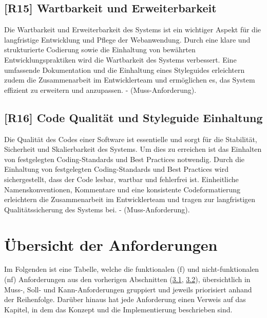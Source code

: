 \subsection{[R15] Wartbarkeit und Erweiterbarkeit}

Die Wartbarkeit und Erweiterbarkeit des Systems ist ein wichtiger Aspekt für die langfristige Entwicklung und Pflege der Webanwendung.
Durch eine klare und strukturierte Codierung sowie die Einhaltung von bewährten Entwicklungspraktiken wird die Wartbarkeit des Systems verbessert.
Eine umfassende Dokumentation und die Einhaltung eines Styleguides erleichtern zudem die Zusammenarbeit im Entwicklerteam und ermöglichen es, das System effizient zu erweitern und anzupassen.
- (Muss-Anforderung).

\subsection{[R16] Code Qualität und Styleguide Einhaltung}

Die Qualität des Codes einer Software ist essentielle und sorgt für die Stabilität, Sicherheit und Skalierbarkeit des Systems.
Um dies zu erreichen ist das Einhalten von festgelegten Coding-Standards und Best Practices notwendig.
Durch die Einhaltung von festgelegten Coding-Standards und Best Practices wird sichergestellt, dass der Code lesbar, wartbar und fehlerfrei ist.
Einheitliche Namenskonventionen, Kommentare und eine konsistente Codeformatierung erleichtern die Zusammenarbeit im Entwicklerteam und tragen zur langfristigen Qualitätssicherung des Systems bei.
- (Muss-Anforderung).

\section{Übersicht der Anforderungen}
\label{chapter:3-section:uebersicht-anforderungen}

Im Folgenden ist eine Tabelle, welche die funktionalen (f) und nicht-funktionalen (nf) Anforderungen aus den vorherigen Abschnitten (\hyperref[chapter:3-section:funktionale-anforderungen]{3.1}, \hyperref[chapter:3-section:nichtfunktionale-anforderungen]{3.2}), übersichtlich in Muss-, Soll- und Kann-Anforderungen gruppiert und jeweils priorisiert anhand der Reihenfolge.
Darüber hinaus hat jede Anforderung einen Verweis auf das Kapitel, in dem das Konzept und die Implementierung beschrieben sind.

